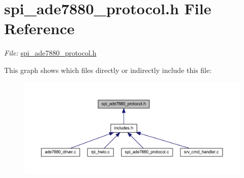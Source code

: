 \hypertarget{a00041}{\section{spi\-\_\-ade7880\-\_\-protocol.\-h File Reference}
\label{dd/d32/a00041}
}


{\itshape File\-:} \hyperlink{a00041}{spi\-\_\-ade7880\-\_\-protocol.\-h} \par
  


This graph shows which files directly or indirectly include this file\-:\nopagebreak
\begin{figure}[H]
\begin{center}
\leavevmode
\includegraphics[width=350pt]{d1/d84/a00052}
\end{center}
\end{figure}
